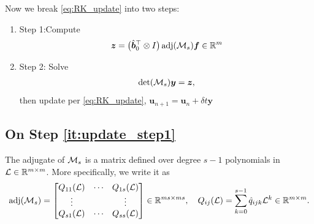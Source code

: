 \documentclass[review]{siamart}
\newcommand{\mdet}{\operatorname{det}}
\newcommand{\madj}{\operatorname{adj}}
\begin{document}
Now we break \eqref{eq:RK_update} into two steps:
\begin{enumerate}
\item{Step 1:}\label{it:update_step1}Compute 
\begin{align} \label{eq:step1}
\bm{z} = \big( \hat{\bm{b}}^\top_0 \otimes I \big) \madj ({\cal M}_s) \bm{f} \in \mathbb{R}^m
\end{align}

\item{Step 2:}\label{it:update_step2} Solve
\begin{align} \label{eq:step2}
\mdet( {\cal M}_s ) \bm{y} = \bm{z},
\end{align}
then update per \eqref{eq:RK_update}, $\bm{u}_{n+1} = \bm{u}_n + \delta t \bm{y}$
\end{enumerate}


\subsection{On Step \ref{it:update_step1}}

The adjugate of ${\cal M}_s$ is a matrix defined over degree  $s-1$ polynomials in ${\cal L} \in \mathbb{R}^{m \times m}$. More specifically, we write it as
\begin{align}
\madj ({\cal M}_s) = 
\begin{bmatrix}
Q_{11}({\cal L}) & \cdots & Q_{1s}({\cal L}) \\
\vdots & & \vdots \\
Q_{s1}({\cal L}) & \cdots & Q_{ss}({\cal L})
\end{bmatrix}
\in \mathbb{R}^{ms \times ms},
\quad
Q_{ij}({\cal L}) = \sum \limits_{k = 0}^{s-1} \hat{q}_{ijk} {\cal L}^k \in \mathbb{R}^{m \times m}.
\end{align}
\end{document}

